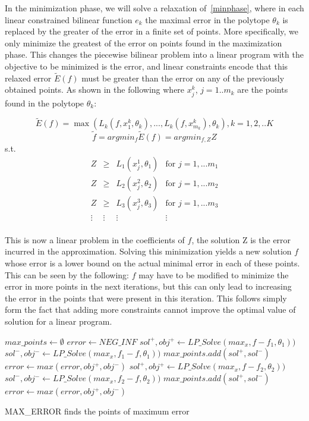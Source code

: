 In the minimization phase, we will solve a relaxation of~\ref{minphase}, where in each linear constrained bilinear function $e_k$ the maximal error in the polytope $\theta_k$ is replaced by the greater of the error in a finite set of points. More specifically, we only minimize the greatest of the error on points found in the maximization phase. This changes the piecewise bilinear problem into a linear program with the objective to be minimized is the error, and linear constraints encode that this relaxed error $\tilde{E}(f)$ must be greater than the error on any of the previously obtained points. As shown in the following where $x^k_j$, $j=1..m_k$ are the points found in the polytope $\theta_k$:

$$ \tilde{E}(f) =\max ( L_k (f, x^k_1, \theta_k), ... , L_k ( f, x^k_{m_k}), \theta_k ), k = 1, 2, .. K$$
$$\tilde{f} = argmin_f\tilde{E}(f) = argmin_{f,Z}  Z $$
s.t. 
$$
	\begin{array}{llll}
		Z & \geq & L_1(x^1_j, \theta_1) & \mbox{for } j = 1,...m_1\\
		Z & \geq & L_2(x^2_j, \theta_2) & \mbox{for } j = 1,...m_2\\
		Z & \geq & L_3(x^3_j, \theta_3) & \mbox{for } j = 1,...m_3\\
		\vdots & \vdots & \vdots & \vdots\\
	\end{array}
$$

This is now a linear problem in the coefficients of $f$, the solution Z is the error incurred in the approximation. 
Solving this minimization yields a new solution $f$ whose error is a lower bound on the actual minimal error in each of these points. This can be seen by the following: $f$ may have to be modified to minimize the error in more points in the next iterations, but this can only lead to increasing the error in the points that were present in this iteration. This follows simply form the fact that adding more constraints cannot improve the optimal value of solution for a linear program.


\begin{algorithm}[!h]
\dontprintsemicolon
{}
$max\_points \gets \emptyset$\;
$error \gets NEG\_INF$\;
 {
	$sol^+, obj^+ \gets LP\_Solve(max _x, f-f_1,\theta_1) )$\;
	$sol^-, obj^- \gets LP\_Solve(max _x, f_1-f,\theta_1) )$\;
	$max\_points.add(sol^+,sol^-)$\; 	$error \gets max(error, obj^+, obj^-)$\; 
	}
 {
	$sol^+, obj^+ \gets LP\_Solve(max _x, f-f_2,\theta_2) )$\;
	$sol^-, obj^- \gets LP\_Solve(max _x, f_2-f,\theta_2) )$\;
	$max\_points.add(sol^+,sol^-)$\; 	$error \gets max(error, obj^+, obj^-)$\; 
	}\;
\caption{{\sc MAX\_ERROR} finds the points of maximum error}
\label{alg:maxError}
\end{algorithm}


